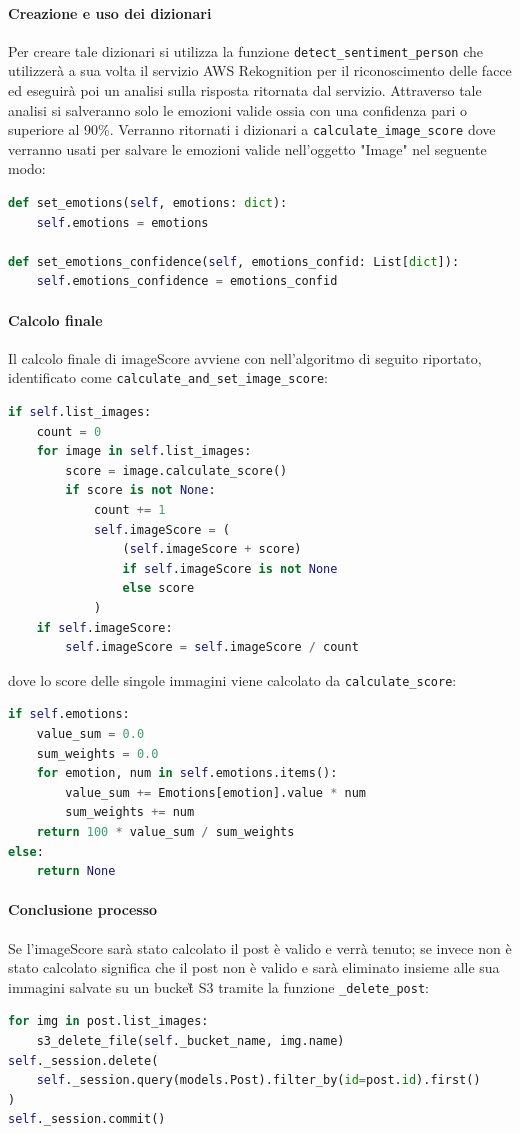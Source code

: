 \paragraph{Creazione e uso dei dizionari} \aCapo{}
Per creare tale dizionari si utilizza la funzione \verb+detect_sentiment_person+ che utilizzerà a sua volta il servizio AWS Rekognition per il riconoscimento delle facce ed eseguirà poi un analisi sulla risposta ritornata dal servizio. Attraverso tale analisi si salveranno solo le emozioni valide ossia con una confidenza pari o superiore al 90\%. Verranno ritornati i dizionari a \verb+calculate_image_score+ dove verranno usati per salvare le emozioni valide nell'oggetto "Image" nel seguente modo:
\begin{lstlisting}[language=Python]
def set_emotions(self, emotions: dict):
    self.emotions = emotions

def set_emotions_confidence(self, emotions_confid: List[dict]):
    self.emotions_confidence = emotions_confid
\end{lstlisting}
\paragraph{Calcolo finale} \aCapo{}
Il calcolo finale di imageScore avviene con nell'algoritmo di seguito riportato, identificato come \verb+calculate_and_set_image_score+: 
\begin{lstlisting}[language=Python]
if self.list_images:
    count = 0
    for image in self.list_images:
        score = image.calculate_score()
        if score is not None:
            count += 1
            self.imageScore = (
                (self.imageScore + score)
                if self.imageScore is not None
                else score
            )
    if self.imageScore:
        self.imageScore = self.imageScore / count
\end{lstlisting}
dove lo score delle singole immagini viene calcolato da \verb+calculate_score+:
\begin{lstlisting}[language=Python]
if self.emotions:
    value_sum = 0.0
    sum_weights = 0.0
    for emotion, num in self.emotions.items():
        value_sum += Emotions[emotion].value * num
        sum_weights += num
    return 100 * value_sum / sum_weights
else:
    return None
\end{lstlisting}
\paragraph{Conclusione processo} \aCapo{}
Se l'imageScore sarà stato calcolato il post è valido e verrà tenuto; se invece non è stato calcolato significa che il post non è valido e sarà eliminato insieme alle sua immagini salvate su un bucket\G{} S3 tramite la funzione \verb+_delete_post+:
\begin{lstlisting}[language=Python]
for img in post.list_images:
    s3_delete_file(self._bucket_name, img.name)
self._session.delete(
    self._session.query(models.Post).filter_by(id=post.id).first()
)
self._session.commit()
\end{lstlisting}

